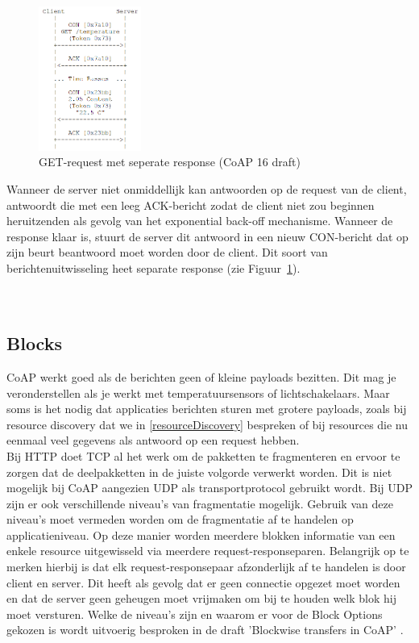 \begin{figure}
\vspace{-40pt}
\includegraphics[width=0.3\textwidth]{fig/CoAPSeperateResponse}
\vspace{-30pt}
\caption{GET-request met seperate response (CoAP 16 draft)}
\label{fig:SeparateResponse}
\vspace{-100pt}
\end{figure}
Wanneer de server niet onmiddellijk kan antwoorden op de request van de client, antwoordt die met een leeg ACK-bericht zodat de client niet zou beginnen heruitzenden als gevolg van het exponential back-off mechanisme. Wanneer de response klaar is, stuurt de server dit antwoord in een nieuw CON-bericht dat op zijn beurt beantwoord moet worden door de client. Dit soort van berichtenuitwisseling heet separate response (zie Figuur~\ref{fig:SeparateResponse}).
\\
\\
\\

\subsection{Blocks} \label{blocks}
CoAP werkt goed als de berichten geen of kleine payloads bezitten. Dit mag je veronderstellen als je werkt met temperatuursensors of lichtschakelaars. Maar soms is het nodig dat applicaties berichten sturen met grotere payloads, zoals bij resource discovery dat we in \ref{resourceDiscovery} bespreken of bij resources die nu eenmaal veel gegevens als antwoord op een request hebben.\\

Bij HTTP doet TCP al het werk om de pakketten te fragmenteren en ervoor te zorgen dat de deelpakketten in de juiste volgorde verwerkt worden. Dit is niet mogelijk bij CoAP aangezien UDP als transportprotocol gebruikt wordt. Bij UDP zijn er ook verschillende niveau's van fragmentatie mogelijk. Gebruik van deze niveau's moet vermeden worden om de fragmentatie af te handelen op applicatieniveau. Op deze manier worden meerdere blokken informatie van een enkele resource uitgewisseld via meerdere request-responseparen. Belangrijk op te merken hierbij is dat elk request-responsepaar afzonderlijk af te handelen is door client en server. Dit heeft als gevolg dat er geen connectie opgezet moet worden en dat de server geen geheugen moet vrijmaken om bij te houden welk blok hij moet versturen. Welke de niveau's zijn en waarom er voor de Block Options gekozen is wordt uitvoerig besproken in de draft 'Blockwise transfers in CoAP' \cite{blockwiseTransfer}.

